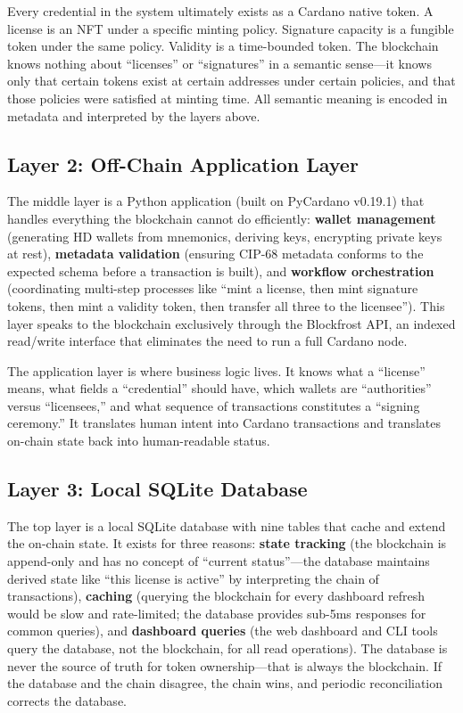 Every credential in the system ultimately exists as a Cardano native token. A license is an NFT under a specific minting policy. Signature capacity is a fungible token under the same policy. Validity is a time-bounded token. The blockchain knows nothing about ``licenses'' or ``signatures'' in a semantic sense---it knows only that certain tokens exist at certain addresses under certain policies, and that those policies were satisfied at minting time. All semantic meaning is encoded in metadata and interpreted by the layers above.

\subsection{Layer 2: Off-Chain Application Layer}

The middle layer is a Python application (built on PyCardano v0.19.1) that handles everything the blockchain cannot do efficiently: \textbf{wallet management} (generating HD wallets from mnemonics, deriving keys, encrypting private keys at rest), \textbf{metadata validation} (ensuring CIP-68 metadata conforms to the expected schema before a transaction is built), and \textbf{workflow orchestration} (coordinating multi-step processes like ``mint a license, then mint signature tokens, then mint a validity token, then transfer all three to the licensee''). This layer speaks to the blockchain exclusively through the Blockfrost API, an indexed read/write interface that eliminates the need to run a full Cardano node.

The application layer is where business logic lives. It knows what a ``license'' means, what fields a ``credential'' should have, which wallets are ``authorities'' versus ``licensees,'' and what sequence of transactions constitutes a ``signing ceremony.'' It translates human intent into Cardano transactions and translates on-chain state back into human-readable status.

\subsection{Layer 3: Local SQLite Database}

The top layer is a local SQLite database with nine tables that cache and extend the on-chain state. It exists for three reasons: \textbf{state tracking} (the blockchain is append-only and has no concept of ``current status''---the database maintains derived state like ``this license is active'' by interpreting the chain of transactions), \textbf{caching} (querying the blockchain for every dashboard refresh would be slow and rate-limited; the database provides sub-5ms responses for common queries), and \textbf{dashboard queries} (the web dashboard and CLI tools query the database, not the blockchain, for all read operations). The database is never the source of truth for token ownership---that is always the blockchain. If the database and the chain disagree, the chain wins, and periodic reconciliation corrects the database.

